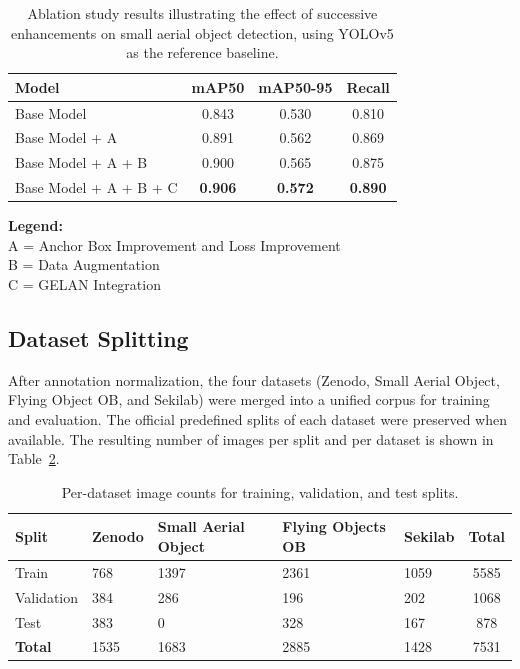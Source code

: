 \documentclass[preprint,review,12pt]{elsarticle}
\begin{document}
\begin{table}[h]
\centering
\begin{tabular}{|l|c|c|c|}
\hline
\textbf{Model} & \textbf{mAP50} & \textbf{mAP50-95} & \textbf{Recall} \\
\hline
Base Model & 0.843 & 0.530 & 0.810 \\
Base Model + A & 0.891 & 0.562 & 0.869 \\
Base Model + A + B & 0.900 & 0.565 & 0.875 \\
Base Model + A + B + C & \textbf{0.906} & \textbf{0.572} & \textbf{0.890} \\
\hline
\end{tabular}%

\begin{minipage}{\textwidth}
\small
\vspace*{2ex}
\textbf{Legend:} \\
A = Anchor Box Improvement and Loss Improvement\\
B = Data Augmentation \\
C = GELAN Integration
\end{minipage}

\caption{Ablation study results illustrating the effect of successive enhancements on small aerial object detection, using YOLOv5 as the reference baseline.}
\label{tab:results}
\end{table}

\begin{highlightbox}
\subsection{Dataset Splitting}
After annotation normalization, the four datasets (Zenodo, Small Aerial Object, Flying Object OB, and Sekilab) were merged into a unified corpus for training and evaluation. The official predefined splits of each dataset were preserved when available. The resulting number of images per split and per dataset is shown in Table~\ref{tab:dataset_split}.
\end{highlightbox}

\begin{table}[h]
\centering
\begin{tabular}{|l|p{2cm}|p{3cm}|p{3cm}|p{2cm}|c|}
\hline
\textbf{Split} 
& \textbf{Zenodo} 
& \textbf{Small Aerial Object} 
& \textbf{Flying Objects OB} 
& \textbf{Sekilab} 
& \textbf{Total} \\ \hline

Train      & 768  & 1397 & 2361 & 1059 & 5585 \\ \hline
Validation & 384  & 286  & 196  & 202  & 1068 \\ \hline
Test       & 383  & 0    & 328  & 167  & 878  \\ \hline
\textbf{Total} & 1535 & 1683 & 2885 & 1428 & 7531 \\ \hline

\end{tabular}
\caption{Per-dataset image counts for training, validation, and test splits.}
\label{tab:dataset_split}
\end{table}
\end{document}

